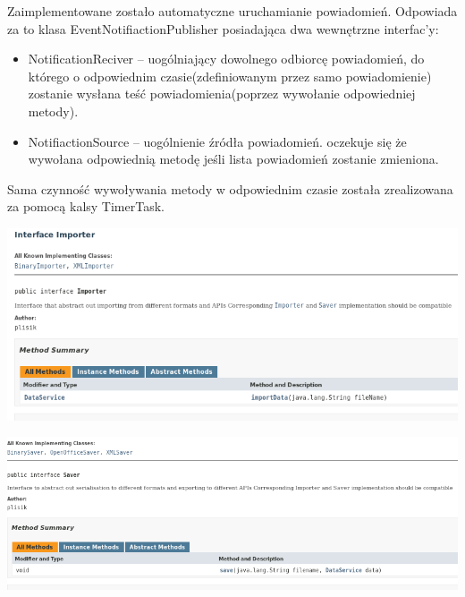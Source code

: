 \documentclass[a4paper,12pt]{article}
\begin{document}
Zaimplementowane zostało automatyczne uruchamianie powiadomień. Odpowiada za to klasa EventNotifiactionPublisher posiadająca dwa wewnętrzne interfac'y:
\begin{itemize}
\item NotificationReciver -- uogólniający dowolnego odbiorcę powiadomień, do którego o odpowiednim czasie(zdefiniowanym przez samo powiadomienie) zostanie wysłana teść powiadomienia(poprzez wywołanie odpowiedniej metody).
\item NotifiactionSource -- uogólnienie źródła powiadomień. oczekuje się że wywołana odpowiednią metodę jeśli lista powiadomień zostanie zmieniona. 
\end{itemize}

Sama czynność wywoływania metody w odpowiednim czasie została zrealizowana za pomocą kalsy TimerTask. 


   

\begin{minipage}{\textwidth}

    \includegraphics[width=\textwidth]{./screen/logicLayer/Importer.png}
    \label{Importer}

\end{minipage}

\begin{minipage}{\textwidth}

    \includegraphics[width=\textwidth]{./screen/logicLayer/Saver.png}
    \label{Saver}

\end{minipage}
\end{document}

